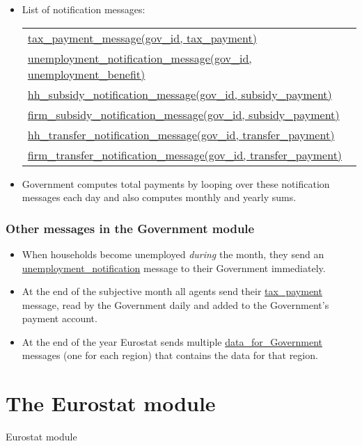 \documentclass{beamer}
\begin{document}
\begin{frame}{}
\frametitle{}
\begin{itemize}
\item List of notification messages:

\begin{tabular}{l}
\hspace{-1.7cm}\small\url{tax_payment_message(gov_id, tax_payment)} \\
\hspace{-1.7cm}\small\url{unemployment_notification_message(gov_id, unemployment_benefit)} \\
\hspace{-1.7cm}\small\url{hh_subsidy_notification_message(gov_id, subsidy_payment)} \\
\hspace{-1.7cm}\small\url{firm_subsidy_notification_message(gov_id, subsidy_payment)} \\
\hspace{-1.7cm}\small\url{hh_transfer_notification_message(gov_id, transfer_payment)} \\
\hspace{-1.7cm}\small\url{firm_transfer_notification_message(gov_id, transfer_payment)}%
\end{tabular}

\item Government computes total payments by looping over these notification
messages each day and also computes monthly and yearly sums.
\end{itemize}
\end{frame}

\begin{frame}{}
\frametitle{Other messages in the Government module}
\begin{itemize}
\item When households become unemployed \emph{during} the month, they send
an \url{unemployment_notification} message to their Government immediately.
\item At the end of the subjective month all agents send their \url{tax_payment}
message, read by the Government daily and added to the Government's payment
account.
\item At the end of the year Eurostat sends multiple %
\url{data_for_Government} messages (one for each region) that contains the
data for that region.
\end{itemize}
\end{frame}

\section{The Eurostat module}
\begin{frame}{}
\LARGE Eurostat module
\end{frame}
\end{document}
